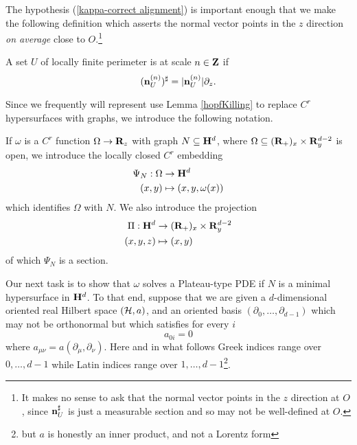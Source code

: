 The hypothesis (\ref{kappa-correct alignment}) is important enough that we make the following definition which asserts the normal vector points in the $z$ direction \emph{on average} close to $O$.\footnote{It makes no sense to ask that the normal vector points in the $z$ direction at $O$, since $\mathbf n^\sharp_U$ is just a measurable section and so may not be well-defined at $O$.}

\begin{definition}
A set $U$ of locally finite perimeter is  at scale $n \in \mathbf{Z}$ if
$$(\mathbf n^{(n)}_U)^\sharp = |\mathbf n^{(n)}_U|\partial_z.$$
\end{definition}

Since we frequently will represent use Lemma \ref{hopfKilling} to replace $C^r$ hypersurfaces with graphs, we introduce the following notation.

\begin{notation}\label{hyperbolic line bundle}
    If $\omega$ is a $C^r$ function $\Omega \to \mathbf{R}_z$ with graph $N \subseteq \mathbf H^d$, where $\Omega \subseteq (\mathbf{R}_+)_x \times \mathbf{R}^{d - 2}_y$ is open, we introduce the locally closed $C^r$ embedding
    \begin{align*}
        \Psi_N: \Omega &\to \mathbf H^d \\
        (x, y) &\mapsto (x, y, \omega(x))
    \end{align*}
    which identifies $\Omega$ with $N$.
    We also introduce the projection
    \begin{align*}
        \Pi: \mathbf H^d &\to (\mathbf{R}_+)_x \times \mathbf{R}^{d - 2}_y\\
        (x, y, z) &\mapsto (x, y)
    \end{align*}
    of which $\Psi_N$ is a section.
\end{notation}

Our next task is to show that $\omega$ solves a Plateau-type PDE if $N$ is a minimal hypersurface in $\mathbf H^d$.
To that end, suppose that we are given a $d$-dimensional oriented real Hilbert space $(\mathcal H, a)$, and an oriented basis $(\partial_0, \dots, \partial_{d - 1})$ which may not be orthonormal but which satisfies for every $i$
\begin{equation}\label{0th coordinate orthogonal}
a_{0i} = 0
\end{equation}
where $a_{\mu\nu} = a(\partial_\mu, \partial_\nu)$.
Here and in what follows Greek indices range over $0, \dots, d - 1$ while Latin indices range over $1, \dots, d - 1$\footnote{but $a$ is honestly an inner product, and not a Lorentz form}.

